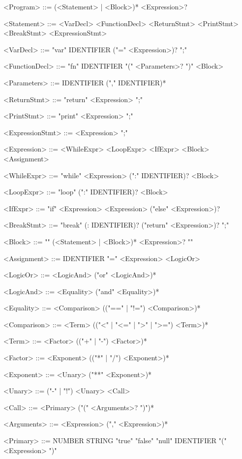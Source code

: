 \begin{grammar}

<Program> ::= (<Statement> | <Block>)* <Expression>?

<Statement> ::= <VarDecl>
              \alt <FunctionDecl>
              \alt <ReturnStmt>
              \alt <PrintStmt>
              \alt <BreakStmt>
              \alt <ExpressionStmt>

<VarDecl> ::= "var" IDENTIFIER ("=" <Expression>)? ";"

<FunctionDecl> ::= "fn" IDENTIFIER "(" <Parameters>? ")" <Block>

<Parameters> ::= IDENTIFIER ("," IDENTIFIER)*

<ReturnStmt> ::= "return" <Expression> ";"

<PrintStmt> ::= "print" <Expression> ";"

<ExpressionStmt> ::= <Expression> ";"

<Expression> ::= <WhileExpr>
               \alt <LoopExpr>
               \alt <IfExpr>
               \alt <Block>
               \alt <Assignment>

<WhileExpr> ::= "while" <Expression> (":" IDENTIFIER)? <Block>

<LoopExpr> ::= "loop" (":" IDENTIFIER)? <Block>

<IfExpr> ::= "if" <Expression> <Expression> ("else" <Expression>)?

<BreakStmt> ::= "break" (: IDENTIFIER)? ("return" <Expression>)? ";"

<Block> ::= "{" (<Statement> | <Block>)* <Expression>? "}"

<Assignment> ::= IDENTIFIER "=" <Expression>
               \alt <LogicOr>

<LogicOr> ::= <LogicAnd> ("or" <LogicAnd>)*

<LogicAnd> ::= <Equality> ("and" <Equality>)*

<Equality> ::= <Comparison> (("==" | "!=") <Comparison>)*

<Comparison> ::= <Term> (("<" | "<=" | ">" | ">=") <Term>)*

<Term> ::= <Factor> (("+" | "-") <Factor>)*

<Factor> ::= <Exponent> (("*" | "/") <Exponent>)*

<Exponent> ::= <Unary> ("**" <Exponent>)*

<Unary> ::= ("-" | "!") <Unary>
          \alt <Call>

<Call> ::= <Primary> ("(" <Arguments>? ")")*

<Arguments> ::= <Expression> ("," <Expression>)*

<Primary> ::= NUMBER
            \alt STRING
            \alt "true"
            \alt "false"
            \alt "null"
            \alt IDENTIFIER
            \alt "(" <Expression> ")"


\end{grammar}
